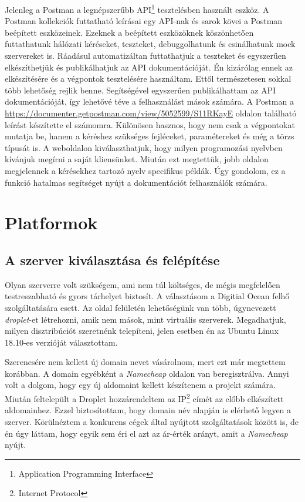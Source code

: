 \documentclass{thesis-ekf}
\theoremstyle{definition}
\theoremstyle{remark}
\begin{document}
Jelenleg a Postman a legnépszerűbb API\footnote{Application Programming Interface} tesztelésben használt eszköz.
A Postman kollekciók futtatható leírásai egy API-nak és sarok kövei a Postman beépített eszközeinek.
Ezeknek a beépített eszközöknek köszönhetően futtathatunk hálózati kéréseket, teszteket, debuggolhatunk és csinálhatunk mock szervereket is.
Ráadásul automatizáltan futtathatjuk a teszteket és egyszerűen elkészíthetjük és publikálhatjuk az API dokumentációját.
Én kizárólag ennek az elkészítésére és a végpontok tesztelésére használtam.
Ettől természetesen sokkal több lehetőség rejlik benne.
Segítségével egyszerűen publikálhattam az API dokumentációját, így lehetővé téve a felhasználást mások számára.
A Postman a \url{https://documenter.getpostman.com/view/5052599/S11RKayE} oldalon található leírást készítette el számomra.
Különösen hasznos, hogy nem csak a végpontokat mutatja be, hanem a kéréshez szükséges fejléceket, paramétereket és még a törzs típusát is.
A weboldalon kiválaszthatjuk, hogy milyen programozási nyelvben kívánjuk megírni a saját kliensünket.
Miután ezt megtettük, jobb oldalon megjelennek a kérésekhez tartozó nyelv specifikus példák.
Úgy gondolom, ez a funkció hatalmas segítséget nyújt a dokumentációt felhasználók számára.

\chapter{Platformok}\label{platformok}

\section{A szerver kiválasztása és felépítése}

Olyan szerverre volt szükségem, ami nem túl költséges, de mégis megfelelően testreszabható és gyors tárhelyet biztosít.
A választásom a Digitial Ocean felhő szolgáltatására esett.
Az oldal felületén lehetőségünk van több, úgynevezett \emph{droplet}-et létrehozni, amik nem mások, mint virtuális szerverek. 
Megadhatjuk, milyen disztribúciót szeretnénk telepíteni, jelen esetben én az Ubuntu Linux 18.10-es verzióját választottam.

Szerencsére nem kellett új domain nevet vásárolnom, mert ezt már megtettem korábban.
A domain egyébként a \emph{Namecheap} oldalon van beregisztrálva.
Annyi volt a dolgom, hogy egy új aldomaint kellett készítenem a projekt számára.
Miután feltelepült a Droplet hozzárendeltem az IP\footnote{Internet Protocol} címét az előbb elkészített aldomainhez.
Ezzel biztosítottam, hogy domain név alapján is elérhető legyen a szerver.
Körülnéztem a konkurens cégek által nyújtott szolgáltatások között is, de én úgy láttam, hogy egyik sem éri el azt az ár-érték arányt, amit a \emph{Namecheap} nyújt. 
\end{document}
